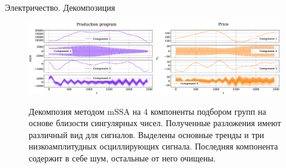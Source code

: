 	\begin{frame}{Электричество. Декомпозиция}
		\begin{figure}[h]
			\centering
			
			\includegraphics[width=0.49\textwidth, keepaspectratio]{img/electricity/mssa/decomposition/Production_program.eps} 
			\includegraphics[width=0.49\textwidth, keepaspectratio]{img/electricity/mssa/decomposition/Price.eps}    
			
			\caption{Декомпозия методом mSSA на 4 компоненты подбором групп на основе близости сингулярных чисел. Полученные разложения имеют различный вид для сигналов. Выделены основные тренды и три низкоамплитудных осциллирующих сигнала. Последняя компонента содержит в себе шум, остальные от него очищены.}
		\end{figure}
	\end{frame}
	
